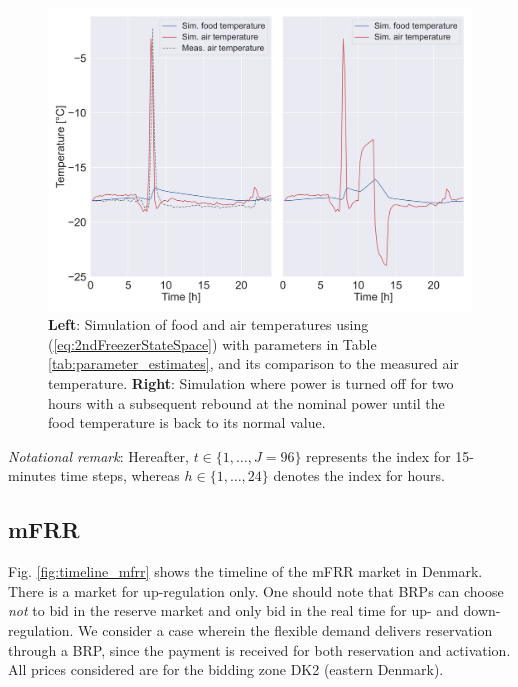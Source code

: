 \begin{figure}[!t]
    \centering
    \includegraphics[width=\columnwidth]{../figures/2ndFreezerModelSimulation.png}
    \caption{ \textbf{Left}: Simulation of food and air temperatures using (\ref{eq:2ndFreezerStateSpace}) with parameters in Table \ref{tab:parameter_estimates}, and its comparison to the measured air temperature. \textbf{Right}: Simulation where power is turned off for two hours with a subsequent rebound at the nominal power until the food temperature is back to its normal value.}
    \label{fig:2ndFreezerModelSimulation}
    \vspace{-3mm}
\end{figure}

\textit{Notational remark}: Hereafter, $t \in \{1, \ldots, J=96\}$ represents the index for 15-minutes time steps, whereas $h\in \{1, \ldots, 24 \}$ denotes the index for hours. 

\vspace{-1mm}
\subsection{mFRR}\label{sec:mFRR}
%
Fig. \ref{fig:timeline_mfrr} shows the timeline of the mFRR market in Denmark. There is a market for up-regulation only. One should note  that BRPs can choose \textit{not} to bid in the reserve market and  only bid in the real time for up- and down-regulation. We consider a case wherein the flexible demand delivers reservation through a BRP, since the payment is received for both reservation and activation. All prices considered are for the bidding zone DK2 (eastern Denmark).


